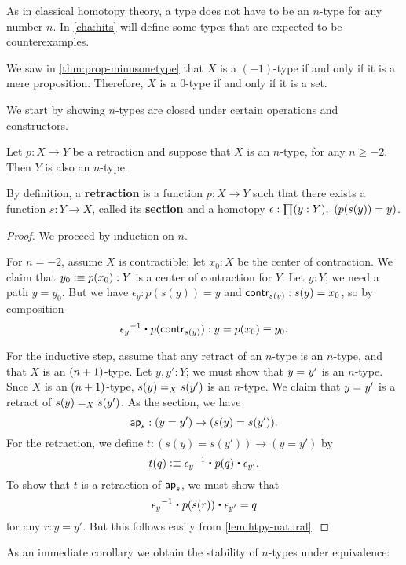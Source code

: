 As in classical homotopy theory, a type does not have to be an $n$-type for any number $n$.
In \autoref{cha:hits} will define some types that are expected to be counterexamples.

\begin{eg}
  We saw in \autoref{thm:prop-minusonetype} that $X$ is a $(-1)$-type if and only if it is a mere proposition.
  Therefore, $X$ is a $0$-type if and only if it is a set.
\end{eg}

We start by showing $n$-types are closed under certain operations and constructors.

\begin{thm}\label{thm:h-level-retracts}
 Let $p : X \to Y$ be a retraction and suppose that $X$ is an $n$-type, for any $n\geq -2$.
 Then $Y$ is also an $n$-type.
\end{thm}

By definition, a \textbf{retraction} is a function $p : X \to Y$ such that there exists a function $s : Y \to X$, called its \textbf{section} and a homotopy $\epsilon:\prd{y:Y} (p(s(y))=y)$.

\begin{proof}
 We proceed by induction on $n$.

 For $n=-2$, assume $X$ is contractible; let $x_0 : X$ be the center of contraction.
 We claim that $y_0 \defeq p(x_0) : Y$ is a center of contraction for $Y$.
 Let $y : Y$; we need a path $y = y_0$.
 But we have $\epsilon_y : p(s(y)) = y$ and $\contr_{s(y)} : s(y) = x_0$, so by composition
 \[ \opp{\epsilon_y} \ct \ap{p}{\contr_{s(y)}} : y = p(x_0) \jdeq y_0 .\]

 For the inductive step, assume that any retract of an $n$-type is an $n$-type, and that $X$ is an $\nplusone$-type.
 Let $y, y' : Y$; we must show that $\id{y}{y'}$ is an $n$-type.
 Snce $X$ is an $\nplusone$-type, $\id[X]{s(y)}{s(y')}$ is an $n$-type.
 We claim that $\id{y}{y'}$ is a retract of $\id[X]{s(y)}{s(y')}$.
 As the section, we have
 \[ \apfunc s : (y=y') \to (s(y)=s(y')). \]
 For the retraction, we define $t:(s(y)=s(y'))\to(y=y')$ by
 \[ t(q) \defeq  \opp{\epsilon_y} \ct \ap p q \ct \epsilon_{y'}.\]
 To show that $t$ is a retraction of $\apfunc s$, we must show that
 \[ \opp{\epsilon_y} \ct \ap p {\ap sr} \ct \epsilon_{y'} = q \]
 for any $r:y=y'$.
 But this follows easily from \autoref{lem:htpy-natural}.
\end{proof}

As an immediate corollary we obtain the stability of $n$-types under equivalence:

